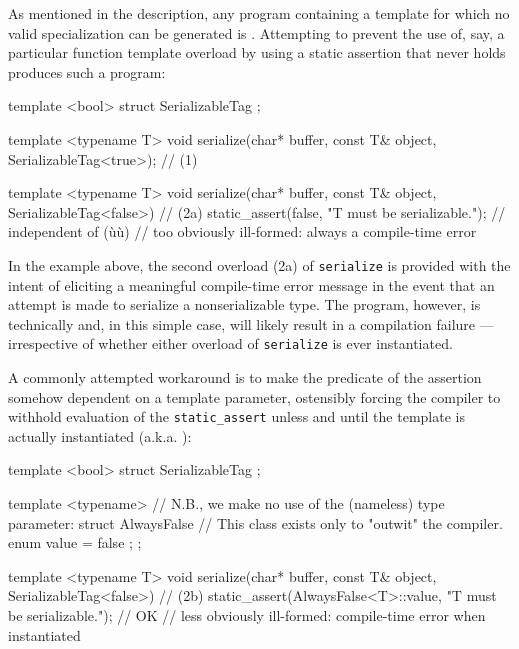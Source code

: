 As mentioned in the description, any program containing a template for
which no valid specialization can be generated is
. Attempting to prevent the
use of, say, a particular function template overload by using a static
assertion that never holds produces such a program:

\begin{emcppslisting}[emcppserrorlines=10]
template <bool>
struct SerializableTag { };

template <typename T>
void serialize(char* buffer, const T& object, SerializableTag<true>);  // (1)

template <typename T>
void serialize(char* buffer, const T& object, SerializableTag<false>)  // (2a)
{
    static_assert(false, "T must be serializable.");  // independent of (ù{}ù)
        // too obviously ill-formed: always a compile-time error
}
\end{emcppslisting}

\noindent In the example above, the second overload (2a) of \lstinline!serialize! is
provided with the intent of eliciting a meaningful compile-time error
message in the event that an attempt is made to serialize a
nonserializable type. The program, however, is technically
 and, in this simple case, will likely result in a
compilation failure --- irrespective of whether either overload of
\lstinline!serialize! is ever instantiated.

A commonly attempted workaround
is to make the predicate of the assertion somehow dependent on a
template parameter, ostensibly forcing the compiler to withhold
evaluation of the \lstinline!static_assert! unless and until the template
is actually instantiated (a.k.a. ):

\begin{emcppshiddenlisting}[emcppsbatch=e4]
template <bool>
struct SerializableTag { };
\end{emcppshiddenlisting}
\begin{emcppslisting}[emcppsbatch=e4]
template <typename>  // N.B., we make no use of the (nameless) type parameter:
struct AlwaysFalse   // This class exists only to "outwit" the compiler.
{
    enum { value = false };
};

template <typename T>
void serialize(char* buffer, const T& object, SerializableTag<false>)  // (2b)
{
    static_assert(AlwaysFalse<T>::value, "T must be serializable.");  // OK
        // less obviously ill-formed: compile-time error when instantiated
}
\end{emcppslisting}

